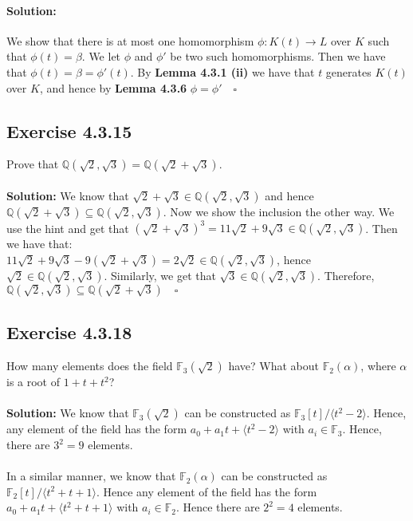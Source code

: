\documentclass{article}
\begin{document}
\paragraph{Solution:}
We show that there is at most one homomorphism $\phi: K(t) \rightarrow L$ over $K$ such that $\phi(t)= \beta$.
We let $\phi$ and $\phi'$ be two such homomorphisms. Then we have that $\phi(t) = \beta = \phi'(t)$. By \textbf{Lemma 4.3.1 (ii)}
we have that $t$ generates $K(t)$ over $K$, and hence by \textbf{Lemma 4.3.6} $\phi = \phi' \quad \square$


\subsection*{Exercise 4.3.15}
Prove that $\mathbb{Q}(\sqrt 2, \sqrt 3) = \mathbb{Q}(\sqrt 2 + \sqrt 3)$.
\\\\
\textbf{Solution:}
We know that $\sqrt2 + \sqrt3 \in \mathbb{Q}(\sqrt2, \sqrt3)$ and hence $\mathbb{Q}(\sqrt2 + \sqrt3) \subseteq \mathbb{Q}(\sqrt2 , \sqrt3)$. Now we show the inclusion the other way.
We use the hint and get that $(\sqrt2 + \sqrt3)^3 = 11\sqrt2 + 9\sqrt3 \in \mathbb{Q}(\sqrt2, \sqrt3)$. Then we have that:\\ $11\sqrt2 + 9\sqrt3 - 9(\sqrt2 + \sqrt3 ) = 2\sqrt2 \in \mathbb{Q}(\sqrt2, \sqrt3)$, 
hence $\sqrt2 \in \mathbb{Q}(\sqrt2, \sqrt3)$. Similarly, we get that $\sqrt3 \in \mathbb{Q}(\sqrt2, \sqrt3)$. Therefore, $\mathbb{Q}(\sqrt2, \sqrt3) \subseteq \mathbb{Q}(\sqrt2 + \sqrt3) \quad \square$


\subsection*{Exercise 4.3.18}
How many elements does the field $\mathbb{F}_3(\sqrt 2)$ have? What about $\mathbb{F}_2(\alpha)$, where $\alpha$ is a root of $1+t+t^2$?
\\\\
\textbf{Solution:}
We know that $\mathbb{F}_3(\sqrt 2)$ can be constructed as $\mathbb{F}_3[t]/\langle t^2 - 2 \rangle$. Hence, any element of the field has the form
$a_0 + a_1t + \langle t^2 - 2\rangle$ with $a_i \in \mathbb{F}_3$. Hence, there are $3^2 = 9$ elements.
\\\\
In a similar manner, we know that $\mathbb{F}_2(\alpha)$ can be constructed as $\mathbb{F}_2[t]/\langle t^2+t+1 \rangle$. Hence any element of the field has the form
$a_0 + a_1t + \langle t^2+t+1\rangle$ with $a_i \in \mathbb{F}_2$. Hence there are $2^2 = 4$ elements.
\end{document}
